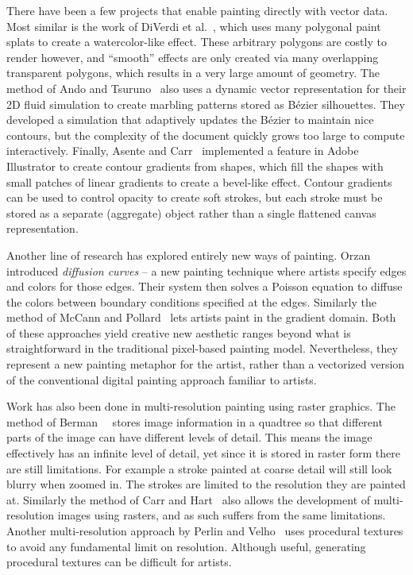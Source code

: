 \documentclass[review]{acmsiggraph}
\begin{document}
There have been a few projects that enable painting directly with vector data.  Most similar is the work of DiVerdi et al.~, which uses many polygonal paint splats to create a watercolor-like effect.  These arbitrary polygons are costly to render however, and ``smooth'' effects are only created via many overlapping transparent polygons, which results in a very large amount of geometry. The method of Ando and Tsuruno~ also uses a dynamic vector representation for their 2D fluid simulation to create marbling patterns stored as B\'{e}zier silhouettes.  They developed a simulation that adaptively updates the B\'{e}zier to maintain nice contours, but the complexity of the document quickly grows too large to compute interactively.  Finally, Asente and Carr~ implemented a feature in Adobe Illustrator to create contour gradients from shapes, which fill the shapes with small patches of linear gradients to create a bevel-like effect.  Contour gradients can be used to control opacity to create soft strokes, but each stroke must be stored as a separate (aggregate) object rather than a single flattened canvas representation.

Another line of research has explored entirely new ways of painting.
Orzan~\etal~
introduced \emph{diffusion curves} --
a new painting technique where artists specify edges and colors for those edges. Their system
then solves a Poisson equation to diffuse the colors between boundary conditions specified at the edges.
Similarly the method of McCann and Pollard~
lets artists paint in the gradient domain. Both of these approaches yield creative new aesthetic ranges 
beyond what is straightforward in the traditional pixel-based painting model. Nevertheless,
they represent a new painting metaphor for the artist, rather than a vectorized version of the conventional
digital painting approach familiar to artists.

Work has also been done in multi-resolution painting using raster graphics. The method of Berman~\etal~
stores image information in a quadtree so that different parts of the image can have different levels of detail.
This means the image effectively has an infinite level of detail, yet since it is stored in raster form
there are still limitations. For example a stroke painted at coarse detail will still look blurry when
zoomed in. The strokes are limited to the resolution they are painted at. Similarly the method of Carr and Hart~
also allows the development of multi-resolution images using rasters, and as such suffers from the
same limitations. Another multi-resolution approach by Perlin and Velho~ uses
procedural textures to avoid any fundamental limit on resolution. Although useful,
generating procedural textures can be difficult for artists.
\end{document}
